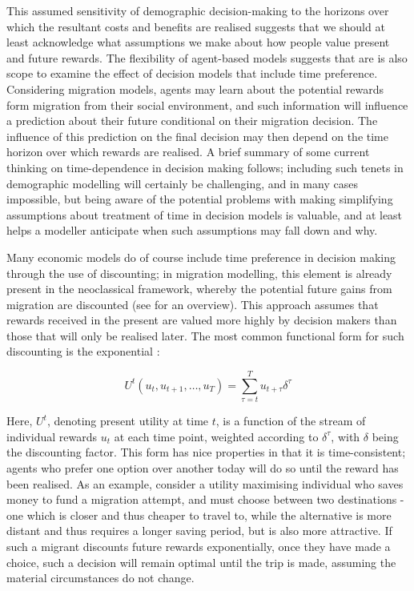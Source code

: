 \documentclass{article}
\begin{document}
This assumed sensitivity of demographic decision-making to the horizons over which the resultant costs and benefits are realised suggests that we should at least acknowledge what assumptions we make about how people value present and future rewards. The flexibility of agent-based models suggests that are is also scope to examine the effect of decision models that include time preference. Considering migration models, agents may learn about the potential rewards form migration from their social environment, and such information will influence a prediction about their future conditional on their migration decision. The influence of this prediction on the final decision may then depend on the time horizon over which rewards are realised.  A brief summary of some current thinking on time-dependence in decision making follows; including such tenets in demographic modelling will certainly be challenging, and in many cases impossible, but being aware of the potential problems with making simplifying assumptions about treatment of time in decision models is valuable, and at least helps a modeller anticipate when such assumptions may fall down and why.

Many economic models do of course include time preference in decision making through the use of discounting; in migration modelling, this element is already present in the neoclassical framework, whereby the potential future gains from migration are discounted (see \citet{Massey1993} for an overview). This approach assumes that rewards received in the present are valued more highly by decision makers than those that will only be realised later. The most common functional form for such discounting is the exponential \citep{ODonoghue2000}:

\[
U^{t}(u_t, u_{t+1},\dots,u_T ) = \sum_{\tau=t}^{T} u_{t+\tau}\delta^{\tau}
\]

Here, \(U^t\), denoting present utility at time \(t\), is a function of the stream of individual rewards \(u_t\) at each time point, weighted  according to \(\delta^{\tau}\), with \(\delta\) being the discounting factor. This form has nice properties in that it is time-consistent; agents who prefer one option over another today will do so until the reward has been realised. As an example, consider a utility maximising individual who saves money to fund a migration attempt, and must choose between two destinations - one which is closer and thus cheaper to travel to, while the alternative is more distant and thus requires a longer saving period, but is also more attractive. If such a migrant discounts future rewards exponentially, once they have made a choice, such a decision will remain optimal until the trip is made, assuming the material circumstances do not change.
\end{document}
